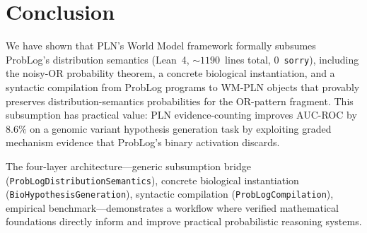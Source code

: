 \documentclass[]{article}
\newcommand{\code}[1]{\texttt{#1}}
\begin{document}
\section{Conclusion}
\label{sec:conclusion}

We have shown that PLN's World Model framework formally subsumes ProbLog's
distribution semantics (Lean~4, ${\sim}1190$~lines total, 0~\code{sorry}),
including the noisy-OR probability theorem, a concrete biological instantiation,
and a syntactic compilation from ProbLog programs to WM-PLN objects that provably
preserves distribution-semantics probabilities for the OR-pattern fragment.
This subsumption has practical value: PLN evidence-counting improves AUC-ROC
by $8.6\%$ on a genomic variant hypothesis generation task by exploiting graded
mechanism evidence that ProbLog's binary activation discards.

The four-layer architecture---generic subsumption bridge
(\code{ProbLogDistributionSemantics}), concrete biological instantiation
(\code{BioHypothesisGeneration}), syntactic compilation
(\code{ProbLogCompilation}), empirical benchmark---demonstrates a workflow
where verified mathematical foundations directly inform and improve practical
probabilistic reasoning systems.



\end{document}
